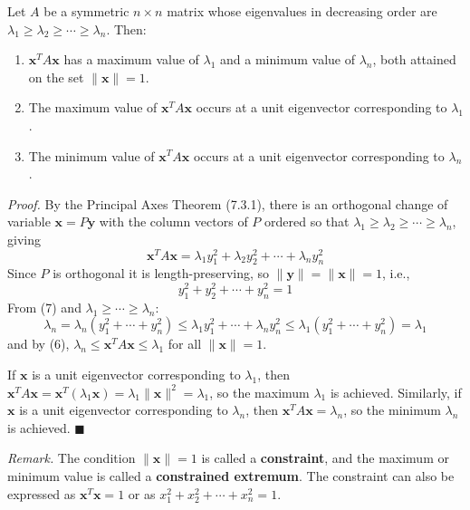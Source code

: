 \documentclass{article}
\begin{document}
\begin{tcolorbox}[colback=red!4, colframe=red!60!black,
  title={\textbf{Theorem 7.4.1 --- Constrained Extremum Theorem}},
  boxrule=0.5mm, arc=3mm]
Let $A$ be a symmetric $n\times n$ matrix whose eigenvalues in decreasing order are
$\lambda_1\ge\lambda_2\ge\cdots\ge\lambda_n$. Then:
\begin{enumerate}
  \item[(a)] $\mathbf{x}^T A\mathbf{x}$ has a maximum value of $\lambda_1$ and a minimum
             value of $\lambda_n$, both attained on the set $\|\mathbf{x}\|=1$.
  \item[(b)] The maximum value of $\mathbf{x}^T A\mathbf{x}$ occurs at a unit eigenvector
             corresponding to $\lambda_1$.
  \item[(c)] The minimum value of $\mathbf{x}^T A\mathbf{x}$ occurs at a unit eigenvector
             corresponding to $\lambda_n$.
\end{enumerate}
\end{tcolorbox}

\textit{Proof.} By the Principal Axes Theorem (7.3.1), there is an orthogonal change of
variable $\mathbf{x}=P\mathbf{y}$ with the column vectors of $P$ ordered so that
$\lambda_1\ge\lambda_2\ge\cdots\ge\lambda_n$, giving
\begin{equation}
  \mathbf{x}^T A\mathbf{x} = \lambda_1y_1^2+\lambda_2y_2^2+\cdots+\lambda_ny_n^2 \tag{6}
\end{equation}
Since $P$ is orthogonal it is length-preserving, so $\|\mathbf{y}\|=\|\mathbf{x}\|=1$, i.e.,
\begin{equation}
  y_1^2+y_2^2+\cdots+y_n^2=1 \tag{7}
\end{equation}
From (7) and $\lambda_1\ge\cdots\ge\lambda_n$:
\[
  \lambda_n = \lambda_n(y_1^2+\cdots+y_n^2)
  \le \lambda_1y_1^2+\cdots+\lambda_ny_n^2
  \le \lambda_1(y_1^2+\cdots+y_n^2) = \lambda_1
\]
and by (6), $\lambda_n\le\mathbf{x}^T A\mathbf{x}\le\lambda_1$ for all $\|\mathbf{x}\|=1$.

If $\mathbf{x}$ is a unit eigenvector corresponding to $\lambda_1$, then
$\mathbf{x}^T A\mathbf{x}=\mathbf{x}^T(\lambda_1\mathbf{x})=\lambda_1\|\mathbf{x}\|^2=\lambda_1$,
so the maximum $\lambda_1$ is achieved. Similarly, if $\mathbf{x}$ is a unit eigenvector
corresponding to $\lambda_n$, then $\mathbf{x}^T A\mathbf{x}=\lambda_n$, so the minimum
$\lambda_n$ is achieved. $\blacksquare$

\textit{Remark.} The condition $\|\mathbf{x}\|=1$ is called a \textbf{constraint}, and the
maximum or minimum value is called a \textbf{constrained extremum}. The constraint can also
be expressed as $\mathbf{x}^T\mathbf{x}=1$ or as $x_1^2+x_2^2+\cdots+x_n^2=1$.
\end{document}
